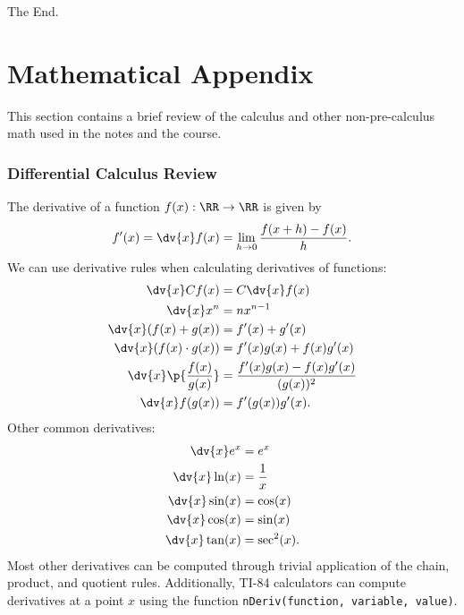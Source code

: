 \documentclass[11pt]{article}
\begin{document}
\bigskip\bigskip

\begin{center}
    The End.
\end{center}


\newpage

\part{Mathematical Appendix}
This section contains a brief review of the calculus and other non-pre-calculus math used in the notes and the course.

\section{Differential Calculus Review}
The derivative of a function $f(x):\RR\to\RR$ is given by
\begin{equation}
    f'(x) = \dv{x} f(x) = \lim_{h\to 0}\frac{f(x+h) - f(x)}{h}.
\end{equation}
We can use  derivative rules when calculating derivatives of functions:
\begin{align}
    \dv{x} Cf(x) &= C\dv{x} f(x) \\
    \dv{x} x^n &= nx^{n-1} \\
    \dv{x} (f(x) + g(x)) &= f'(x) + g'(x) \\
    \dv{x} (f(x) \cdot g(x)) &= f'(x)g(x) + f(x)g'(x) \\
    \dv{x} \p{\frac{f(x)}{g(x)}} &= \frac{f'(x)g(x) - f(x)g'(x)}{(g(x))^2} \\
    \dv{x} f(g(x)) &= f'(g(x))g'(x).
\end{align}
Other common derivatives:
\begin{align}
    \dv{x} e^{x} &= e^x \\
    \dv{x} \ln(x) &= \frac{1}{x} \\
    \dv{x} \sin(x) &= \cos(x) \\
    \dv{x} \cos(x) &= \sin(x) \\
    \dv{x} \tan(x) &= \sec^2(x).
\end{align}
Most other derivatives can be computed through trivial application of the chain, product, and quotient rules. Additionally, TI-84 calculators can compute derivatives at a point $x$ using the function \texttt{nDeriv(function, variable, value)}.
\end{document}
